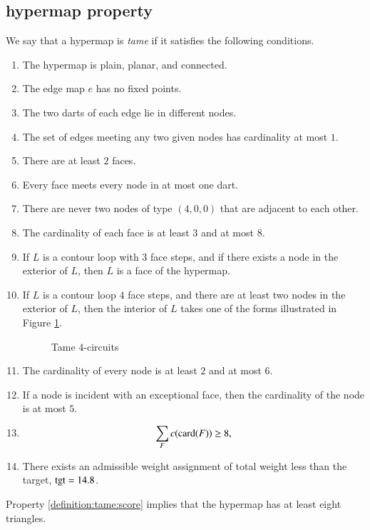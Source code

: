 \subsection{hypermap property}
\label{sec:graphproperty}

We say that a hypermap is {\it tame\/} if it satisfies the following
conditions.
%

\begin{enumerate}
    \label{definition:tame}
    \item The hypermap is plain, planar, and connected.
    \item The edge map $e$ has no fixed points.
    \item The two darts of each edge lie in different nodes.
    \item The set of edges meeting any two given nodes has cardinality at most $1$.
    \item There are at least $2$ faces.
    \item Every face meets every node in at most one
        dart.
    \item There are never two nodes of type $(4,0,0)$ that are
    adjacent to each other.
    \label{definition:tame:40}
    \item The cardinality of each face is at least $3$ and at most $8$.
    \label{definition:tame:length}

    \item If $L$ is a contour loop with $3$ face steps, and if there exists a node in
    the exterior of $L$, then $L$ is a face of the hypermap.
    \label{definition:tame:3-circuit}

    \item If $L$ is a contour loop  $4$ face steps, and there are at least two nodes
    in the exterior of $L$, then the interior of $L$ takes one of the forms
    illustrated in Figure
    \ref{fig:fourcircuit}.
    \label{definition:tame:4-circuit}
    \begin{figure}[htb]
        \centering
        \caption{Tame $4$-circuits}
        \label{fig:fourcircuit}
    \end{figure}

    \item The cardinality of every node is at least $2$ and at most
    $6$.
    \label{definition:tame:degree}

    \item If a node is incident with an exceptional face,
        then the cardinality of the node is at most $5$.
    \label{definition:tame:degreeE}

    \item $$\sum_F c({\operatorname{card}}(F)) \ge 8,$$
    \label{definition:tame:score}


    \item There exists an admissible weight assignment
        of total weight less than the target, ${\operatorname{tgt}}=14.8$.
    \label{definition:tame:squander}



\end{enumerate}
%
Property \ref{definition:tame:score} implies that the hypermap has
at least eight triangles.


